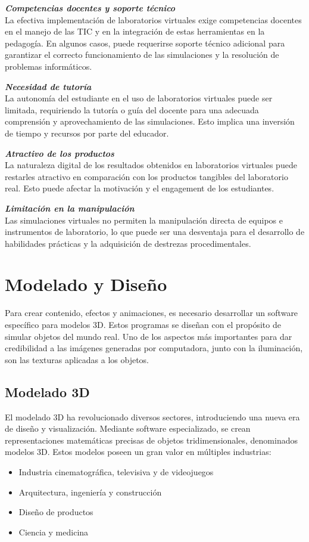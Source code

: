 \textbf{\textit{Competencias docentes y soporte técnico}}\\
 La efectiva implementación de laboratorios virtuales exige competencias docentes en el manejo de las TIC y en la integración de estas herramientas en la pedagogía. En algunos casos, puede requerirse soporte técnico adicional para garantizar el correcto funcionamiento de las simulaciones y la resolución de problemas informáticos.
 
\textbf{\textit{Necesidad de tutoría}}\\
La autonomía del estudiante en el uso de laboratorios virtuales puede ser limitada, requiriendo la tutoría o guía del docente para una adecuada comprensión y aprovechamiento de las simulaciones. Esto implica una inversión de tiempo y recursos por parte del educador.

\textbf{\textit{Atractivo de los productos}}\\La naturaleza digital de los resultados obtenidos en laboratorios virtuales puede restarles atractivo en comparación con los productos tangibles del laboratorio real. Esto puede afectar la motivación y el engagement de los estudiantes.

\textbf{\textit{Limitación en la manipulación}}\\
Las simulaciones virtuales no permiten la manipulación directa de equipos e instrumentos de laboratorio, lo que puede ser una desventaja para el desarrollo de habilidades prácticas y la adquisición de destrezas procedimentales.
\newpage
\section{Modelado y Diseño}
Para crear contenido, efectos y animaciones, es necesario desarrollar un software específico para modelos 3D. Estos programas se diseñan con el propósito de simular objetos del mundo real. Uno de los aspectos más importantes para dar credibilidad a las imágenes generadas por computadora, junto con la iluminación, son las texturas aplicadas a los objetos.

\subsection{Modelado 3D}
El modelado 3D ha revolucionado diversos sectores, introduciendo una nueva era de diseño y visualización. Mediante software especializado, se crean representaciones matemáticas precisas de objetos tridimensionales, denominados modelos 3D. Estos modelos poseen un gran valor en múltiples industrias:
\begin{itemize}
    \item Industria cinematográfica, televisiva y de videojuegos
    \item Arquitectura, ingeniería y construcción
    \item Diseño de productos
    \item Ciencia y medicina
\end{itemize}


